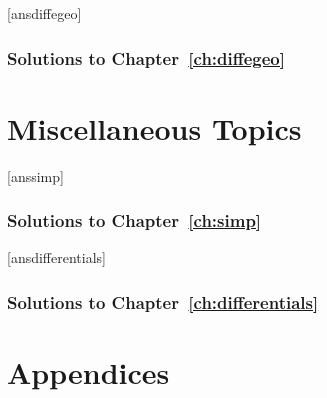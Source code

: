 \documentclass[12pt]{book}
\theoremstyle{definition}
\numberwithin{exercise}{section}
\begin{document}
	[ansdiffegeo]
	
	\newpage{}
	\section*{Solutions to Chapter~\ref{ch:diffegeo}}
	


\part{Miscellaneous Topics}
	[anssimp]
	
	\newpage{}
	\section*{Solutions to Chapter~\ref{ch:simp}}
	

	[ansdifferentials]
	
	\newpage{}
	\section*{Solutions to Chapter~\ref{ch:differentials}}
	

\appendix
\part{Appendices}
	
\end{document}
